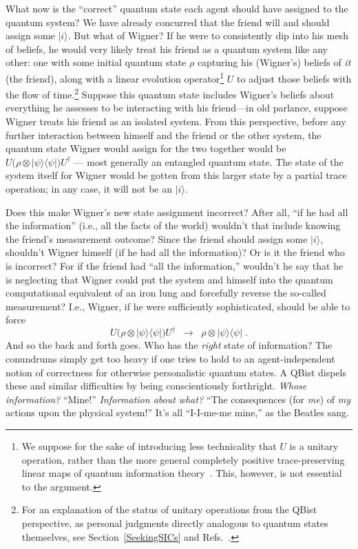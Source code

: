 \documentclass[aps,pra,superscriptaddress,10pt,tightenlines,twocolumn,nofootinbib]{revtex4}
\begin{document}
What now is the ``correct'' quantum state each agent should have assigned to the quantum system?  We have already concurred that the friend will and
should assign some $|i\rangle$.  But what of Wigner?  If he were to
consistently dip into his mesh of beliefs, he would very likely treat
his friend as a quantum system like any other:  one with some initial
quantum state $\rho$ capturing his (Wigner's) beliefs of {\it it\/}
(the friend), along with a linear evolution operator\footnote{We
  suppose for the sake of introducing less technicality that $U$ is a
  unitary operation, rather than the more general completely positive
  trace-preserving linear maps of quantum information
  theory~\cite{Nielsen00}.  This, however, is not essential to the
  argument.} $U$ to adjust those beliefs with the flow of
time.\footnote{For an explanation of the status of unitary operations
  from the QBist perspective, as personal judgments directly analogous
  to quantum states themselves, see Section~\ref{SeekingSICs} and
  Refs.~\cite{Fuchs02,RMP,Leifer06}.}  Suppose this quantum state
includes Wigner's beliefs about everything he assesses to be
interacting with his friend---in old parlance, suppose Wigner treats
his friend as an isolated system. From this perspective, before any further interaction between himself and the friend or the other system, the quantum state Wigner would assign for the two together would be $U\big(\rho\otimes|\psi\rangle\langle\psi|\big)U^\dagger$ --- most generally an entangled quantum state.  The state of the system itself for Wigner would be gotten from this larger state by a partial trace operation; in any case, it will not be an $|i\rangle$.

Does this make Wigner's new state assignment incorrect?  After all, ``if he had all the information'' (i.e., all the facts of the world) wouldn't that include knowing the friend's measurement outcome? Since the friend should assign some $|i\rangle$, shouldn't Wigner himself (if he had all the information)?  Or is it the friend who is incorrect?  For if the friend had ``all the information,'' wouldn't he say that he is neglecting that Wigner could put the system and himself into the quantum computational equivalent of an iron lung and forcefully reverse the so-called measurement?  I.e., Wigner, if he were sufficiently sophisticated, should be able to force
\begin{equation}
U\big(\rho\otimes|\psi\rangle\langle\psi|\big)U^\dagger\;\;\longrightarrow\;\;\rho\otimes|\psi\rangle\langle\psi|\;.
\label{RatifiedLatified}
\end{equation}
And so the back and forth goes.  Who has the {\it right\/} state of information?  The conundrums simply get too heavy if one tries to hold to an agent-independent notion of correctness for otherwise personalistic quantum states.  A QBist dispels these and similar difficulties by being conscientiously forthright.  {\it Whose information?\/}  ``Mine!''  {\it Information about what?\/}  ``The consequences (for {\it me\/}) of {\it my\/} actions upon the physical system!''  It's all ``I-I-me-me mine,'' as the Beatles sang.
\end{document}
